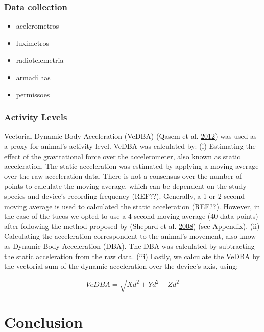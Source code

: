 \documentclass[msc,numbers,hidelinks]{coppe}
\providecommand{\tightlist}{%
  \setlength{\itemsep}{0pt}\setlength{\parskip}{0pt}}
\begin{document}
  \hypertarget{data-collection}{%
  \subsection{Data collection}\label{data-collection}}
  \begin{itemize}
  \tightlist
  \item
    acelerometros
  \item
    luximetros
  \item
    radiotelemetria
  \item
    armadilhas
  \item
    permissoes
  \end{itemize}
  \hypertarget{activity-levels}{%
  \subsection{Activity Levels}\label{activity-levels}}

  Vectorial Dynamic Body Acceleration (VeDBA) (Qasem et al. \protect\hyperlink{ref-qasemTriAxialDynamicAcceleration2012}{2012}) was used as a proxy for animal's activity level. VeDBA was calculated by: (i) Estimating the effect of the gravitational force over the accelerometer, also known as static acceleration. The static acceleration was estimated by applying a moving average over the raw acceleration data. There is not a consensus over the number of points to calculate the moving average, which can be dependent on the study species and device's recording frequency (REF??). Generally, a 1 or 2-second moving average is used to calculated the static acceleration (REF??). However, in the case of the tucos we opted to use a 4-second moving average (40 data points) after following the method proposed by (Shepard et al. \protect\hyperlink{ref-shepardDerivationBodyMotion2008}{2008}) (see Appendix). (ii) Calculating the acceleration correspondent to the animal's movement, also know as Dynamic Body Acceleration (DBA). The DBA was calculated by subtracting the static acceleration from the raw data. (iii) Lastly, we calculate the VeDBA by the vectorial sum of the dynamic acceleration over the device's axis, using:

  \[ VeDBA = \sqrt{Xd^2 + Yd^2 + Zd^2} \]

  \hypertarget{conclusion-1}{%
  \chapter*{Conclusion}\label{conclusion-1}}
\end{document}
